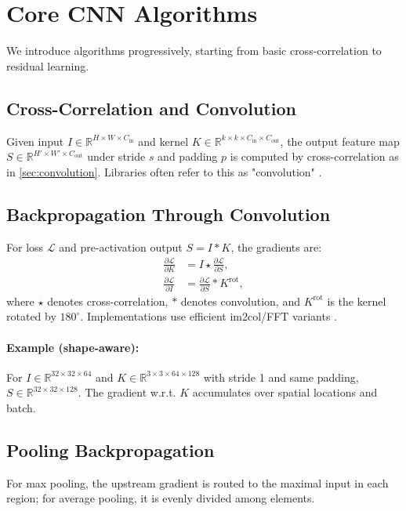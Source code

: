 
\section{Core CNN Algorithms}
\label{sec:cnn-algorithms}

We introduce algorithms progressively, starting from basic cross-correlation to residual learning.

\subsection{Cross-Correlation and Convolution}
Given input $I\in\mathbb{R}^{H\times W\times C_{\text{in}}}$ and kernel $K\in\mathbb{R}^{k\times k\times C_{\text{in}}\times C_{\text{out}}}$, the output feature map $S\in\mathbb{R}^{H'\times W'\times C_{\text{out}}}$ under stride $s$ and padding $p$ is computed by cross-correlation as in \cref{sec:convolution}. Libraries often refer to this as "convolution" \cite{GoodfellowEtAl2016}.

\subsection{Backpropagation Through Convolution}
For loss $\mathcal{L}$ and pre-activation output $S = I * K$, the gradients are:
\begin{align}
\frac{\partial \mathcal{L}}{\partial K} &= I \star \frac{\partial \mathcal{L}}{\partial S},\\
\frac{\partial \mathcal{L}}{\partial I} &= \frac{\partial \mathcal{L}}{\partial S} * K^\text{rot},
\end{align}
where $\star$ denotes cross-correlation, $*$ denotes convolution, and $K^\text{rot}$ is the kernel rotated by $180^{\circ}$. Implementations use efficient im2col/FFT variants \cite{GoodfellowEtAl2016}.

\paragraph{Example (shape-aware):} For $I\in\mathbb{R}^{32\times32\times 64}$ and $K\in\mathbb{R}^{3\times3\times64\times128}$ with stride 1 and same padding, $S\in\mathbb{R}^{32\times32\times128}$. The gradient w.r.t. $K$ accumulates over spatial locations and batch.

\subsection{Pooling Backpropagation}
For max pooling, the upstream gradient is routed to the maximal input in each region; for average pooling, it is evenly divided among elements.

